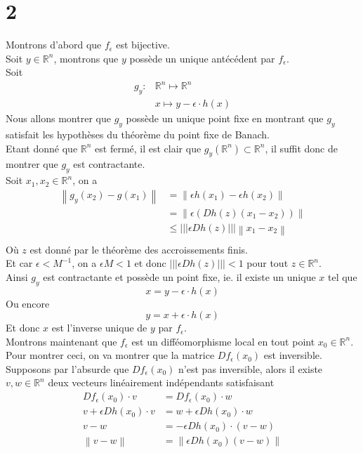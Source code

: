 \documentclass[11pt, a4paper]{article}
\newcommand\ns[1]{\left\vert\left\vert\left\vert#1\right\vert\right\vert\right\vert}
\newcommand\N[1]{\left\lVert#1\right\rVert}
\begin{document}
\section*{2}
Montrons d'abord que $f_{\epsilon} $ est bijective.\\
Soit $y \in \mathbb{R}^{n}$, montrons que $y$ possède un unique antécédent par $f_\epsilon$.\\
Soit 
\begin{align*}
	g_y\colon &\mathbb{R}^{n} \mapsto \mathbb{R}^n\\
	     &x \mapsto y - \epsilon \cdot h( x) 
\end{align*}
Nous allons montrer que $g_y$ possède un unique point fixe en montrant que $g_y$ satisfait les hypothèses du théorème du point fixe de Banach.\\
Etant donné que $ \mathbb{R}^n$ est fermé, il est clair que $g_y ( \mathbb{R}^n) \subset \mathbb{R}^n$, il suffit donc de montrer que $g_y$ est contractante.\\
Soit $x_1, x_2\in \mathbb{R}^n$, on a 
\begin{align*}
	\N { g_y( x_2) - g( x_1) } &= \N { \epsilon h( x_1) - \epsilon h( x_2) } \\
				   &= \N { \epsilon\left(  Dh( z) ( x_1-x_2) \right)} \\
				   &\leq \ns { \epsilon Dh( z) }  \N { x_1-x_2} \\
\end{align*}
Où $z$ est donné par le théorème des accroissements finis.\\
Et car $\epsilon < M^{-1}$, on a $\epsilon M <1$ et donc $\ns{\epsilon Dh( z)} <1$ pour tout $z \in \mathbb{R}^n$.\\
Ainsi $g_y$ est contractante et possède un point fixe, ie. il existe un unique $x$ tel que
\[ 
	x = y - \epsilon \cdot h( x) 
\]
Ou encore
\[ 
	y= x + \epsilon \cdot h( x) 
\]
Et donc $x$ est l'inverse unique de $y$ par $f_\epsilon$.\\
Montrons maintenant que $f_\epsilon$ est un difféomorphisme local en tout point $x_0\in \mathbb{R}^n$.\\
Pour montrer ceci, on va montrer que la matrice $Df_\epsilon( x_0) $ est inversible.\\
Supposons par l'absurde que $Df_\epsilon( x_0) $ n'est pas inversible, alors il existe $v,w \in \mathbb{R}^n$ deux vecteurs linéairement indépendants satisfaisant
\begin{align*}
	Df_\epsilon( x_0) \cdot v &= Df_\epsilon( x_0) \cdot w\\
	v + \epsilon Dh( x_0) \cdot v &= w + \epsilon Dh( x_0) \cdot w\\
	v-w &= - \epsilon Dh( x_0)\cdot ( v-w) \\
	\N { v-w} &= \N { \epsilon Dh( x_0) ( v-w) } 
\end{align*}
\end{document}
